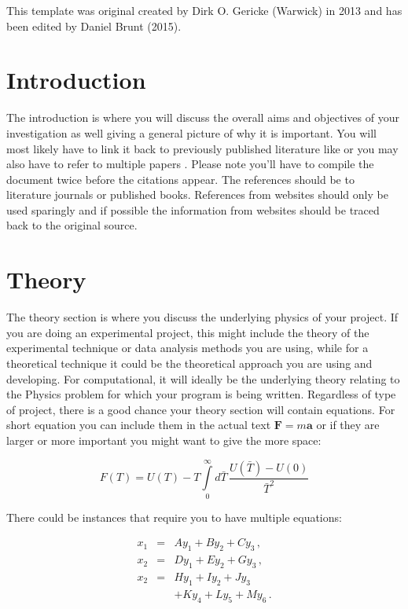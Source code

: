 \documentclass[a4paper,twocolumn,12pt, notitlepage]{article}
\begin{document}
This template was original created by Dirk O. Gericke (Warwick) in 2013 and has been edited by Daniel Brunt (2015). 


\section{Introduction}
The introduction is where you will discuss the overall aims and objectives of your investigation as well giving a general picture of why it is important. You will most likely have to link it back to previously published literature like  \cite{Paper_1} or you may also have to refer to multiple papers \cite{Paper_1, Paper_2, Paper_3}. Please note you'll have to compile the document twice before the citations appear. The references should be to literature journals or published books. References from websites should only be used sparingly and if possible the information from websites should be traced back to the original source. 




\section{Theory}
The theory section is where you discuss the underlying physics of your project. If you are doing an experimental project, this might include the theory of the experimental technique or data analysis methods you are using, while for a theoretical technique it could be the theoretical approach you are using and developing. For computational, it will ideally be the underlying theory relating to the Physics problem for which your program is being written. Regardless of type of project, there is a good chance your theory section will contain equations. For short equation you can include them in the actual text $\mathbf{F} = m\mathbf{a}$ or if they are larger or more important you might want to give the more space:

\begin{equation}
F(T) = U(T) - T \int\limits_0^\infty d \bar{T} \, \frac{U(\bar{T}) - U(0)}{\bar{T}^2}
\end{equation}

There could be instances that require you to have multiple equations:

\begin{eqnarray}
x_1 &=& A y_1 + B y_2 + C y_3    \,, \\
x_2 &=& D y_1 + E y_2 + G y_3    \,, \\ 
x_2 &=& H y_1 + I y_2 + J y_3    \nonumber\\
    &~& + K y_4 + L y_5 + M y_6  \,. 
\label{eq: eq_2}
\end{eqnarray}
\end{document}
